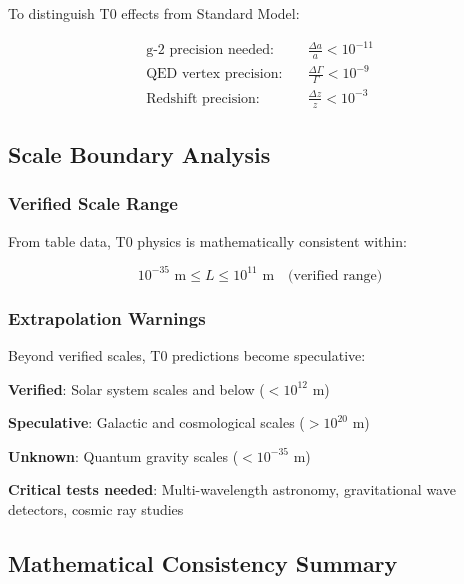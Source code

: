 \documentclass[12pt,a4paper]{article}
\begin{document}
	To distinguish T0 effects from Standard Model:
	
	\begin{align}
		\text{g-2 precision needed:} \quad &\frac{\Delta a}{a} < 10^{-11} \\
		\text{QED vertex precision:} \quad &\frac{\Delta\Gamma}{\Gamma} < 10^{-9} \\
		\text{Redshift precision:} \quad &\frac{\Delta z}{z} < 10^{-3}
	\end{align}
	
	\subsection{Scale Boundary Analysis}
	\label{subsec:scale_boundaries}
	
	\subsubsection{Verified Scale Range}
	
	From table data, T0 physics is mathematically consistent within:
	
	\begin{equation}
		10^{-35} \text{ m} \leq L \leq 10^{11} \text{ m} \quad \text{(verified range)}
	\end{equation}
	
	\subsubsection{Extrapolation Warnings}
	
	Beyond verified scales, T0 predictions become speculative:
	
	\begin{tcolorbox}[colback=yellow!5!white,colframe=orange!75!black,title=Scale Extrapolation Warning]
		\textbf{Verified}: Solar system scales and below ($< 10^{12}$ m)
		
		\textbf{Speculative}: Galactic and cosmological scales ($> 10^{20}$ m)
		
		\textbf{Unknown}: Quantum gravity scales ($< 10^{-35}$ m)
		
		\textbf{Critical tests needed}: Multi-wavelength astronomy, gravitational wave detectors, cosmic ray studies
	\end{tcolorbox}
	
	\subsection{Mathematical Consistency Summary}
	\label{subsec:consistency_summary}
	
\end{document}
